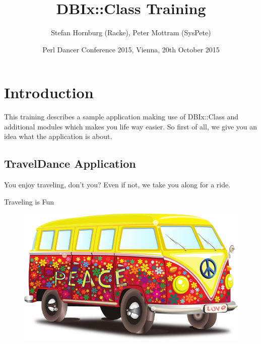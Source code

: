 \title{DBIx::Class Training}
\author{Stefan Hornburg (Racke), Peter Mottram (SysPete)}
\date{Perl Dancer Conference 2015, Vienna, 20th October 2015}


\maketitle



\begin{frame}
  \titlepage
\end{frame}

\cleardoublepage

\tableofcontents

\cleardoublepage

\section{Introduction}

This training describes a sample application making use of
DBIx::Class and additional modules which makes you life
way easier. So first of all, we give you an idea what
the application is about.

\subsection{TravelDance Application}

You enjoy traveling, don't you? Even if not, we take you
along for a ride.

\begin{frame}{Traveling is Fun}
\begin{figure}[!ht]
\centering
\includegraphics[width=1\linewidth]{img/volkswagen.png}
\end{figure}
\end{frame}


